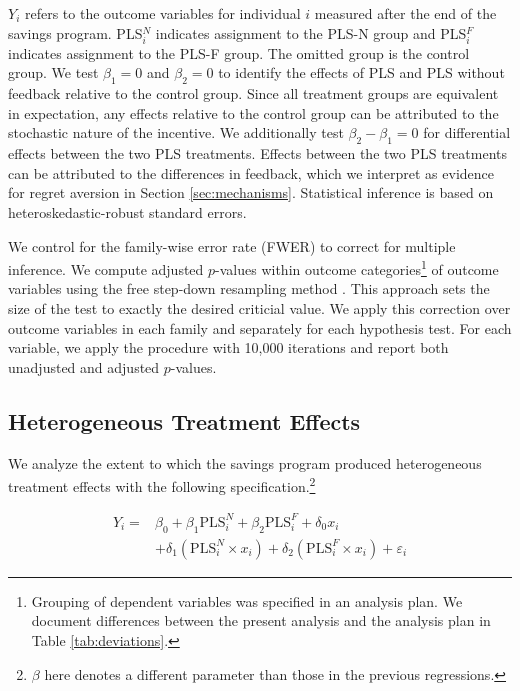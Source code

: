 \documentclass[11pt]{article}
\begin{document}
		$Y_{i}$ refers to the outcome variables for individual $i$ measured after the end of the savings program. PLS$^N_i$ indicates assignment to the PLS-N group and PLS$^F_i$ indicates assignment to the PLS-F group. The omitted group is the control group. We test $\beta_{1} = 0$ and $\beta_{2} = 0$ to identify the effects of PLS and PLS without feedback relative to the control group. Since all treatment groups are equivalent in expectation, any effects relative to the control group can be attributed to the stochastic nature of the incentive. We additionally test $\beta_{2} - \beta_{1} = 0$ for differential effects between the two PLS treatments. Effects between the two PLS treatments can be attributed to the differences in feedback, which we interpret as evidence for regret aversion in Section \ref{sec:mechanisms}. Statistical inference is based on heteroskedastic-robust standard errors.

		We control for the family-wise error rate (FWER) to correct for multiple inference. We compute adjusted $p$-values within outcome categories\footnote{Grouping of dependent variables was specified in an analysis plan. We document differences between the present analysis and the analysis plan in Table \ref{tab:deviations}.} of outcome variables using the free step-down resampling method \parencite{westfall_resampling-based_1993,anderson_multiple_2008}. This approach sets the size of the test to exactly the desired criticial value. We apply this correction over outcome variables in each family and separately for each hypothesis test. For each variable, we apply the procedure with 10,000 iterations and report both unadjusted and adjusted $p$-values.

	\subsection{Heterogeneous Treatment Effects}

		We analyze the extent to which the savings program produced heterogeneous treatment effects with the following specification.\footnote{$\beta$ here denotes a different parameter than those in the previous regressions.}

		\begin{equation} \begin{split}
		Y_{i} = & \beta_{0} + \beta_{1}\text{PLS}^{N}_{i} + \beta_{2}\text{PLS}^{F}_{i} + \delta_{0}x_{i} \\
					& + \delta_{1}(\text{PLS}^{N}_{i} \times x_{i}) + \delta_{2}(\text{PLS}^{F}_{i} \times x_{i}) + \varepsilon_{i}
		\end{split} \label{eq:heteffect} \end{equation}
\end{document}
